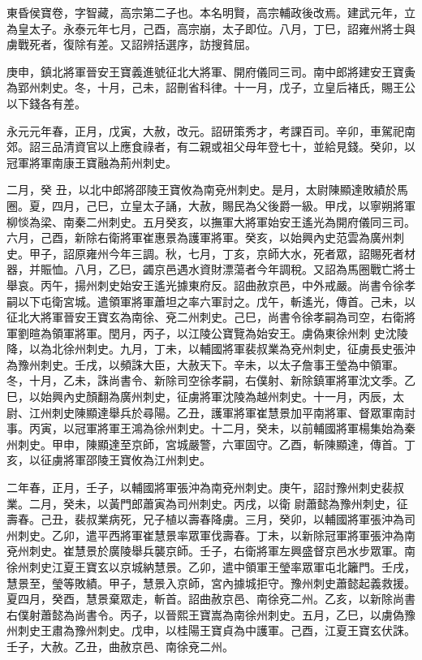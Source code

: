 
\begin{pinyinscope}

 東昏侯寶卷，字智藏，高宗第二子也。本名明賢，高宗輔政後改焉。建武元年，立為皇太子。永泰元年七月，己酉，高宗崩，太子即位。八月，丁巳，詔雍州將士與虜戰死者，復除有差。又詔辨括選序，訪搜貧屈。



 庚申，鎮北將軍晉安王寶義進號征北大將軍、開府儀同三司。南中郎將建安王寶夤為郢州刺史。冬，十月，己未，詔刪省科律。十一月，戊子，立皇后褚氏，賜王公以下錢各有差。



 永元元年春，正月，戊寅，大赦，改元。詔研策秀才，考課百司。辛卯，車駕祀南郊。詔三品清資官以上應食祿者，有二親或祖父母年登七十，並給見錢。癸卯，以冠軍將軍南康王寶融為荊州刺史。



 二月，癸
 丑，以北中郎將邵陵王寶攸為南兗州刺史。是月，太尉陳顯達敗績於馬圈。夏，四月，己巳，立皇太子誦，大赦，賜民為父後爵一級。甲戌，以寧朔將軍柳惔為梁、南秦二州刺史。五月癸亥，以撫軍大將軍始安王遙光為開府儀同三司。六月，己酉，新除右衛將軍崔惠景為護軍將軍。癸亥，以始興內史范雲為廣州刺史。甲子，詔原雍州今年三調。秋，七月，丁亥，京師大水，死者眾，詔賜死者材器，并賑恤。八月，乙巳，蠲京邑遇水資財漂蕩者今年調稅。又詔為馬圈戰亡將士舉哀。丙午，揚州刺史始安王遙光據東府反。詔曲赦京邑，中外戒嚴。尚書令徐孝嗣以下屯衛宮城。遣領軍將軍蕭坦之率六軍討之。戊午，斬遙光，傳首。己未，以征北大將軍晉安王寶玄為南徐、兗二州刺史。己巳，尚書令徐孝嗣為司空，右衛將軍劉暄為領軍將軍。閏月，丙子，以江陵公寶覽為始安王。虜偽東徐州刺
 史沈陵降，以為北徐州刺史。九月，丁未，以輔國將軍裴叔業為兗州刺史，征虜長史張沖為豫州刺史。壬戌，以頻誅大臣，大赦天下。辛未，以太子詹事王瑩為中領軍。冬，十月，乙未，誅尚書令、新除司空徐孝嗣，右僕射、新除鎮軍將軍沈文季。乙巳，以始興內史顏翻為廣州刺史，征虜將軍沈陵為越州刺史。十一月，丙辰，太尉、江州刺史陳顯達舉兵於尋陽。乙丑，護軍將軍崔慧景加平南將軍、督眾軍南討事。丙寅，以冠軍將軍王鴻為徐州刺史。十二月，癸未，以前輔國將軍楊集始為秦州刺史。甲申，陳顯達至京師，宮城嚴警，六軍固守。乙酉，斬陳顯達，傳首。丁亥，以征虜將軍邵陵王寶攸為江州刺史。



 二年春，正月，壬子，以輔國將軍張沖為南兗州刺史。庚午，詔討豫州刺史裴叔業。二月，癸未，以黃門郎蕭寅為司州刺史。丙戌，以衛
 尉蕭懿為豫州刺史，征壽春。己丑，裴叔業病死，兄子植以壽春降虜。三月，癸卯，以輔國將軍張沖為司州刺史。乙卯，遣平西將軍崔慧景率眾軍伐壽春。丁未，以新除冠軍將軍張沖為南兗州刺史。崔慧景於廣陵舉兵襲京師。壬子，右衛將軍左興盛督京邑水步眾軍。南徐州刺史江夏王寶玄以京城納慧景。乙卯，遣中領軍王瑩率眾軍屯北籬門。壬戌，慧景至，瑩等敗績。甲子，慧景入京師，宮內據城拒守。豫州刺史蕭懿起義救援。夏四月，癸酉，慧景棄眾走，斬首。詔曲赦京邑、南徐兗二州。乙亥，以新除尚書右僕射蕭懿為尚書令。丙子，以晉熙王寶嵩為南徐州刺史。五月，乙巳，以虜偽豫州刺史王肅為豫州刺史。戊申，以桂陽王寶貞為中護軍。己酉，江夏王寶玄伏誅。壬子，大赦。乙丑，曲赦京邑、南徐兗二州。




\end{pinyinscope}
